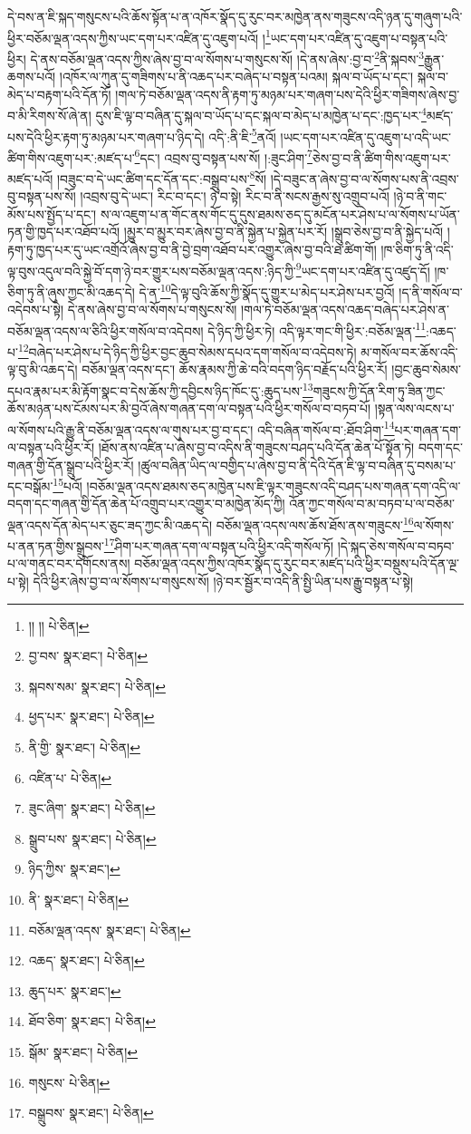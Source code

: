 དེ་བས་ན་ཇི་སྐད་གསུངས་པའི་ཆོས་སྟོན་པ་ན་འཁོར་སྣོད་དུ་རུང་བར་མཁྱེན་ནས་གཟུངས་འདི་ཉན་དུ་གཞུག་པའི་ཕྱིར་བཅོམ་ལྡན་འདས་ཀྱིས་ཡང་དག་པར་འཛིན་དུ་འཇུག་པའོ། །\footnote{།། །།  པེ་ཅིན། }ཡང་དག་པར་འཛིན་དུ་འཇུག་པ་བསྟན་པའི་ཕྱིར། དེ་ནས་བཅོམ་ལྡན་འདས་ཀྱིས་ཞེས་བྱ་བ་ལ་སོགས་པ་གསུངས་སོ། །དེ་ནས་ཞེས་:བྱ་བ་\footnote{བྱ་བས་  སྣར་ཐང་།  པེ་ཅིན། }ནི་སྐབས་\footnote{སྐབས་སམ་  སྣར་ཐང་།  པེ་ཅིན། }རྒྱུན་ཆགས་པའོ། །འཁོར་ལ་ཀུན་དུ་གཟིགས་པ་ནི་འཆད་པར་བཞེད་པ་བསྟན་པའམ། སྐལ་བ་ཡོད་པ་དང་། སྐལ་བ་མེད་པ་བརྟག་པའི་དོན་ཏོ། །གལ་ཏེ་བཅོམ་ལྡན་འདས་ནི་རྟག་ཏུ་མཉམ་པར་གཞག་པས་དེའི་ཕྱིར་གཟིགས་ཞེས་བྱ་བ་མི་རིགས་སོ་ཞེ་ན། དུས་ཇི་ལྟ་བ་བཞིན་དུ་སྐལ་བ་ཡོད་པ་དང་སྐལ་བ་མེད་པ་མཁྱེན་པ་དང་:ཁྱད་པར་\footnote{ཕྱད་པར་  སྣར་ཐང་།  པེ་ཅིན། }མཛད་པས་དེའི་ཕྱིར་རྟག་ཏུ་མཉམ་པར་གཞག་པ་ཉིད་དེ། འདི་:ནི་ཇི་\footnote{ནི་གྱི་  སྣར་ཐང་།  པེ་ཅིན། }ནའོ། །ཡང་དག་པར་འཛིན་དུ་འཇུག་པ་འདི་ཡང་ཚིག་གིས་འཇུག་པར་:མཛད་པ་\footnote{འཛིན་པ་  པེ་ཅིན། }དང་། འབྲས་བུ་བསྟན་པས་སོ། །:ཟུང་ཤིག་\footnote{ཟུང་ཞིག་  སྣར་ཐང་།  པེ་ཅིན། }ཅེས་བྱ་བ་ནི་ཚིག་གིས་འཇུག་པར་མཛད་པའོ། །བཟུང་བ་དེ་ཡང་ཚིག་དང་དོན་དང་:བསྒྲུབ་པས་\footnote{སྒྲུབ་པས་  སྣར་ཐང་།  པེ་ཅིན། }སོ། །དེ་བཟུང་ན་ཞེས་བྱ་བ་ལ་སོགས་པས་ནི་འབྲས་བུ་བསྟན་པས་སོ། །འབྲས་བུ་དེ་ཡང་། རིང་བ་དང་། ཉེ་བ་སྟེ། རིང་བ་ནི་སངས་རྒྱས་སུ་འགྲུབ་པའོ། །ཉེ་བ་ནི་གང་མོས་པས་སྤྱོད་པ་དང་། ས་ལ་འཇུག་པ་ན་གོང་ནས་གོང་དུ་དུས་ཐམས་ཅད་དུ་མངོན་པར་ཤེས་པ་ལ་སོགས་པ་ཡོན་ཏན་གྱི་ཁྱད་པར་འཐོབ་པའོ། །མྱུར་བ་མྱུར་བར་ཞེས་བྱ་བ་ནི་སྐྱེན་པ་སྐྱེན་པར་རོ། །སྒྲུབ་ཅེས་བྱ་བ་ནི་སྐྱེད་པའོ། །རྟག་ཏུ་ཁྱད་པར་དུ་ཡང་འགྲོའོ་ཞེས་བྱ་བ་ནི་བྱེ་བྲག་འཐོབ་པར་འགྱུར་ཞེས་བྱ་བའི་ཐ་ཚིག་གོ། །ཁ་ཅིག་ཏུ་ནི་འདི་ལྟ་བུས་འདུལ་བའི་སྐྱེ་བོ་དག་ཉེ་བར་གྱུར་པས་བཅོམ་ལྡན་འདས་:ཉིད་ཀྱི་\footnote{ཉིད་ཀྱིས་  སྣར་ཐང་། }ཡང་དག་པར་འཛིན་དུ་འཛུད་དོ། །ཁ་ཅིག་ཏུ་ནི་ཞུས་ཀྱང་མི་འཆད་དེ། དེ་ན་\footnote{ནི་  སྣར་ཐང་།  པེ་ཅིན། }དེ་ལྟ་བུའི་ཆོས་ཀྱི་སྣོད་དུ་གྱུར་པ་མེད་པར་ཤེས་པར་བྱའོ། །ད་ནི་གསོལ་བ་འདེབས་པ་སྟེ། དེ་ནས་ཞེས་བྱ་བ་ལ་སོགས་པ་གསུངས་སོ། །གལ་ཏེ་བཅོམ་ལྡན་འདས་འཆད་བཞེད་པར་ཤེས་ན་བཅོམ་ལྡན་འདས་ལ་ཅིའི་ཕྱིར་གསོལ་བ་འདེབས། དེ་ཉིད་ཀྱི་ཕྱིར་ཏེ། འདི་ལྟར་གང་གི་ཕྱིར་:བཅོམ་ལྡན་\footnote{བཅོམ་ལྡན་འདས་  སྣར་ཐང་།  པེ་ཅིན། }:འཆད་པ་\footnote{འཆད་  སྣར་ཐང་།  པེ་ཅིན། }བཞེད་པར་ཤེས་པ་དེ་ཉིད་ཀྱི་ཕྱིར་བྱང་ཆུབ་སེམས་དཔའ་དག་གསོལ་བ་འདེབས་ཏེ། མ་གསོལ་བར་ཆོས་འདི་ལྟ་བུ་མི་འཆད་དེ། བཅོམ་ལྡན་འདས་དང་། ཆོས་རྣམས་ཀྱི་ཆེ་བའི་བདག་ཉིད་བརྗོད་པའི་ཕྱིར་རོ། །བྱང་ཆུབ་སེམས་དཔའ་རྣམ་པར་མི་རྟོག་སྣང་བ་དེས་ཆོས་ཀྱི་དབྱིངས་ཉིད་ཁོང་དུ་:ཆུད་པས་\footnote{ཆུད་པར་  སྣར་ཐང་། }གཟུངས་ཀྱི་དོན་རིག་ཏུ་ཟིན་ཀྱང་ཆོས་མཉན་པས་ངོམས་པར་མི་བྱའོ་ཞེས་གཞན་དག་ལ་བསྟན་པའི་ཕྱིར་གསོལ་བ་བཏབ་པོ། །སྟན་ལས་ལངས་པ་ལ་སོགས་པའི་རྒྱུ་ནི་བཅོམ་ལྡན་འདས་ལ་གུས་པར་བྱ་བ་དང་། འདི་བཞིན་གསོལ་བ་:ཐོབ་ཤིག་\footnote{ཐོབ་ཅིག་  སྣར་ཐང་།  པེ་ཅིན། }པར་གཞན་དག་ལ་བསྟན་པའི་ཕྱིར་རོ། །ཐོས་ནས་འཛིན་པ་ཞེས་བྱ་བ་འདིས་ནི་གཟུངས་བཤད་པའི་དོན་ཆེན་པོ་སྟོན་ཏེ། བདག་དང་གཞན་གྱི་དོན་སྒྲུབ་པའི་ཕྱིར་རོ། །ཚུལ་བཞིན་ཡིད་ལ་བགྱིད་པ་ཞེས་བྱ་བ་ནི་དེའི་དོན་ཇི་ལྟ་བ་བཞིན་དུ་བསམ་པ་དང་བསྒོམ་\footnote{སྒོམ་  སྣར་ཐང་།  པེ་ཅིན། }པའོ། །བཅོམ་ལྡན་འདས་ཐམས་ཅད་མཁྱེན་པས་ཇི་ལྟར་གཟུངས་འདི་བཤད་པས་གཞན་དག་འདི་ལ་བདག་དང་གཞན་གྱི་དོན་ཆེན་པོ་འགྲུབ་པར་འགྱུར་བ་མཁྱེན་མོད་ཀྱི། འོན་ཀྱང་གསོལ་བ་མ་བཏབ་པ་ལ་བཅོམ་ལྡན་འདས་དོན་མེད་པར་ཅུང་ཟད་ཀྱང་མི་འཆད་དེ། བཅོམ་ལྡན་འདས་ལས་ཆོས་ཐོས་ནས་གཟུངས་\footnote{གསུངས་  པེ་ཅིན། }ལ་སོགས་པ་ནན་ཏན་གྱིས་སྒྲུབས་\footnote{བསྒྲུབས་  སྣར་ཐང་།  པེ་ཅིན། }ཤིག་པར་གཞན་དག་ལ་བསྟན་པའི་ཕྱིར་འདི་གསོལ་ཏོ། །དེ་སྐད་ཅེས་གསོལ་བ་བཏབ་པ་ལ་གནང་བར་དགོངས་ནས། བཅོམ་ལྡན་འདས་ཀྱིས་འཁོར་སྣོད་དུ་རུང་བར་མཛད་པའི་ཕྱིར་བསྡུས་པའི་དོན་ལྔ་པ་སྟེ། དེའི་ཕྱིར་ཞེས་བྱ་བ་ལ་སོགས་པ་གསུངས་སོ། །ཉེ་བར་སྦྱོར་བ་འདི་ནི་སྤྱི་ཡིན་པས་རྒྱུ་བསྟན་པ་སྟེ། 